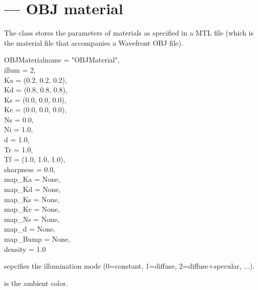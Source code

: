 
\section{ ---
         OBJ material}
\label{objmaterial}

The  class stores the parameters of materials
as specified in a MTL file (which is the material file that accompanies 
a Wavefront OBJ file).

\begin{classdesc}{OBJMaterial}{name = "OBJMaterial",\\ 
                               illum = 2,\\
                               Ka = (0.2, 0.2, 0.2),\\
                               Kd = (0.8, 0.8, 0.8),\\
                               Ks = (0.0, 0.0, 0.0),\\
                               Ke = (0.0, 0.0, 0.0),\\
                               Ns = 0.0,\\
                               Ni = 1.0,\\
                               d = 1.0,\\
                               Tr = 1.0,\\
                               Tf = (1.0, 1.0, 1.0),\\
                               sharpness = 0.0,\\
                               map_Ka = None,\\
                               map_Kd = None,\\
                               map_Ks = None,\\
                               map_Ke = None,\\
                               map_Ns = None,\\
                               map_d = None,\\
                               map_Bump = None,\\
                               density = 1.0\\
	                      }

 sepcifies the illumination mode (0=constant, 1=diffuse, 2=diffuse+specular, ...).

 is the ambient color.


\end{classdesc}
